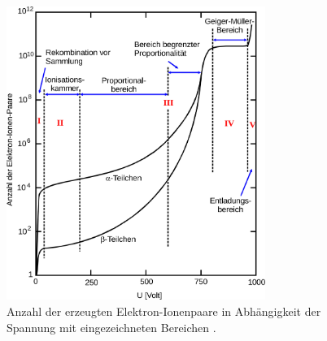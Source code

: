    \begin{figure}
      \centering
      \includegraphics[width=0.75\textwidth]{content/img/V703_Abb2.jpg}
      \caption{Anzahl der erzeugten Elektron-Ionenpaare in Abhängigkeit der Spannung mit eingezeichneten Bereichen \cite{versuchsanleitung}.}
      \label{fig:abb2}
    \end{figure}

